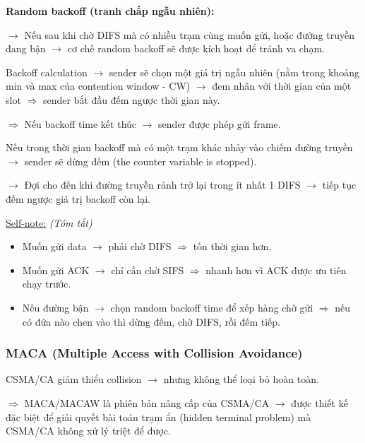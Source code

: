 \vspace{0.3cm}

\noindent
\textbf{Random backoff (tranh chấp ngẫu nhiên):}
\medskip

\noindent
$\rightarrow$ Nếu sau khi chờ DIFS mà có nhiều trạm cùng muốn gửi, hoặc đường truyền đang bận $\rightarrow$ cơ chế random backoff sẽ được kích hoạt để tránh va chạm.
\medskip

\noindent
Backoff calculation $\rightarrow$ sender sẽ chọn một giá trị ngẫu nhiên (nằm trong khoảng min và max của contention window - CW) $\rightarrow$ đem nhân với thời gian của một slot $\Rightarrow$ sender bắt đầu đếm ngược thời gian này.

$\Rightarrow$ Nếu backoff time kết thúc $\rightarrow$ sender được phép gửi frame.
\medskip

\noindent
Nếu trong thời gian backoff mà có một trạm khác nhảy vào chiếm đường truyền $\rightarrow$ sender sẽ dừng đếm (the counter variable is stopped).

$\rightarrow$ Đợi cho đến khi đường truyền rảnh trở lại trong ít nhất 1 DIFS $\rightarrow$ tiếp tục đếm ngược giá trị backoff còn lại.
\medskip

\pagebreak

\noindent
\underline{Self-note:} \textit{(Tóm tắt)}

\begin{itemize}
    \item Muốn gửi data $\rightarrow$ phải chờ DIFS $\Rightarrow$ tốn thời gian hơn.
    \item Muốn gửi ACK $\rightarrow$ chỉ cần chờ SIFS $\Rightarrow$ nhanh hơn vì ACK được ưu tiên chạy trước.
    \item Nếu đường bận $\rightarrow$ chọn random backoff time để xếp hàng chờ gửi $\Rightarrow$ nếu có đứa nào chen vào thì dừng đếm, chờ DIFS, rồi đếm tiếp.
\end{itemize}
\medskip

\subsubsection{MACA (Multiple Access with Collision Avoidance)}

\noindent
CSMA/CA giảm thiểu collision $\rightarrow$ nhưng không thể loại bỏ hoàn toàn.

$\Rightarrow$ MACA/MACAW là phiên bản nâng cấp của CSMA/CA $\rightarrow$ được thiết kế đặc biệt để giải quyết bài toán trạm ẩn (hidden terminal problem) mà CSMA/CA không xử lý triệt để được.
\medskip

